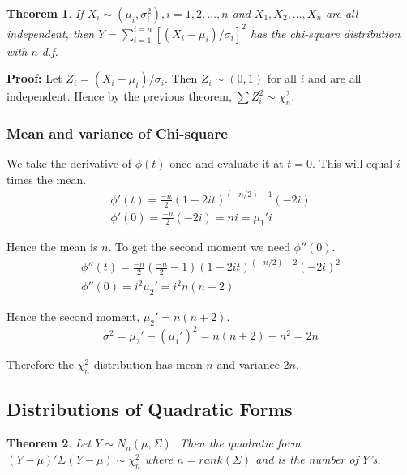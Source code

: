 \documentclass{article}
\newtheorem{theorem}{Theorem}[section]
\begin{document}
\begin{theorem}
    If \(X_i\sim(\mu_i,\sigma_i^2),i=1,2,\dots,n\) and \(X_1,X_2,\dots,X_n\) are all independent, then \(Y=\sum_{i=1}^{i=n}[(X_i-\mu_i)/\sigma_i]^2\) has the chi-square distribution with \(n\) d.f.
\end{theorem}

\textbf{Proof:} Let \(Z_i=(X_i-\mu_i)/\sigma_i\). Then \(Z_i\sim(0,1)\) for all \(i\) and are all independent. Hence by the previous theorem, \(\sum Z_i^2\sim\chi_n^2\).

\subsubsection{Mean and variance of Chi-square}

We take the derivative of \(\phi(t)\) once and evaluate it at \(t=0\). This will equal \(i\) times the mean.
\begin{equation*}
    \begin{split}
        \phi'(t)=\frac{-n}{2}(1-2it)^{(-n/2)-1}(-2i)\\
        \phi'(0)=\frac{-n}{2} (-2i) = ni = \mu_1'i
    \end{split}
\end{equation*}

Hence the mean is \(n\). To get the second moment we need \(\phi''(0)\).
\begin{equation*}
    \begin{split}
        \phi''(t)=\frac{-n}{2} \left(\frac{-n}{2}-1\right)(1-2it)^{(-n/2)-2}(-2i)^2\\
        \phi''(0)=i^2\mu_2'=i^2n(n+2)
    \end{split}
\end{equation*}

Hence the second moment, \(\mu_2'=n(n+2)\).
\begin{equation*}
    \sigma^2=\mu_2'-(\mu_1')^2=n(n+2)-n^2=2n
\end{equation*}

Therefore the \(\chi_n^2\) distribution has mean \(n\) and variance \(2n\).

\subsection{Distributions of Quadratic Forms}

\begin{theorem}
    Let \(Y\sim N_n(\mu,\Sigma)\). Then the quadratic form \((Y-\mu)'\Sigma(Y-\mu)\sim\chi_n^2\) where \(n=rank(\Sigma)\) and is the number of \(Y\)'s.
\end{theorem}
\end{document}
